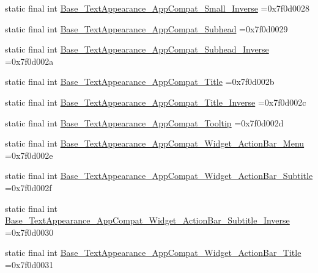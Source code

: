 \begin{DoxyCompactItemize}
\item 
static final int \mbox{\hyperlink{classbr_1_1unb_1_1cic_1_1mp_1_1marketmaster_1_1R_1_1style_a9877690461bbf5658a63ee315701c788}{Base\+\_\+\+Text\+Appearance\+\_\+\+App\+Compat\+\_\+\+Small\+\_\+\+Inverse}} =0x7f0d0028
\item 
static final int \mbox{\hyperlink{classbr_1_1unb_1_1cic_1_1mp_1_1marketmaster_1_1R_1_1style_ad56e3c83719999e55124dd1f1fbd82e1}{Base\+\_\+\+Text\+Appearance\+\_\+\+App\+Compat\+\_\+\+Subhead}} =0x7f0d0029
\item 
static final int \mbox{\hyperlink{classbr_1_1unb_1_1cic_1_1mp_1_1marketmaster_1_1R_1_1style_a33bcdb98cf284e6f0665488d6d539f50}{Base\+\_\+\+Text\+Appearance\+\_\+\+App\+Compat\+\_\+\+Subhead\+\_\+\+Inverse}} =0x7f0d002a
\item 
static final int \mbox{\hyperlink{classbr_1_1unb_1_1cic_1_1mp_1_1marketmaster_1_1R_1_1style_aee56211896437369e50ab88514bccfb5}{Base\+\_\+\+Text\+Appearance\+\_\+\+App\+Compat\+\_\+\+Title}} =0x7f0d002b
\item 
static final int \mbox{\hyperlink{classbr_1_1unb_1_1cic_1_1mp_1_1marketmaster_1_1R_1_1style_abb226100b6dd26f4a2cc56af714db05d}{Base\+\_\+\+Text\+Appearance\+\_\+\+App\+Compat\+\_\+\+Title\+\_\+\+Inverse}} =0x7f0d002c
\item 
static final int \mbox{\hyperlink{classbr_1_1unb_1_1cic_1_1mp_1_1marketmaster_1_1R_1_1style_ad056819773316f21ef3f46dc7c0c0d73}{Base\+\_\+\+Text\+Appearance\+\_\+\+App\+Compat\+\_\+\+Tooltip}} =0x7f0d002d
\item 
static final int \mbox{\hyperlink{classbr_1_1unb_1_1cic_1_1mp_1_1marketmaster_1_1R_1_1style_ad9d92425eea929cb0ba499e4fdb413c8}{Base\+\_\+\+Text\+Appearance\+\_\+\+App\+Compat\+\_\+\+Widget\+\_\+\+Action\+Bar\+\_\+\+Menu}} =0x7f0d002e
\item 
static final int \mbox{\hyperlink{classbr_1_1unb_1_1cic_1_1mp_1_1marketmaster_1_1R_1_1style_ad73bbd7b89671955cd7eca913e446d71}{Base\+\_\+\+Text\+Appearance\+\_\+\+App\+Compat\+\_\+\+Widget\+\_\+\+Action\+Bar\+\_\+\+Subtitle}} =0x7f0d002f
\item 
static final int \mbox{\hyperlink{classbr_1_1unb_1_1cic_1_1mp_1_1marketmaster_1_1R_1_1style_a8105facd02c3be3bf695ea1515e38f80}{Base\+\_\+\+Text\+Appearance\+\_\+\+App\+Compat\+\_\+\+Widget\+\_\+\+Action\+Bar\+\_\+\+Subtitle\+\_\+\+Inverse}} =0x7f0d0030
\item 
static final int \mbox{\hyperlink{classbr_1_1unb_1_1cic_1_1mp_1_1marketmaster_1_1R_1_1style_ac24ac8b981cd760b590dfc980fe66c38}{Base\+\_\+\+Text\+Appearance\+\_\+\+App\+Compat\+\_\+\+Widget\+\_\+\+Action\+Bar\+\_\+\+Title}} =0x7f0d0031

\end{DoxyCompactItemize}
